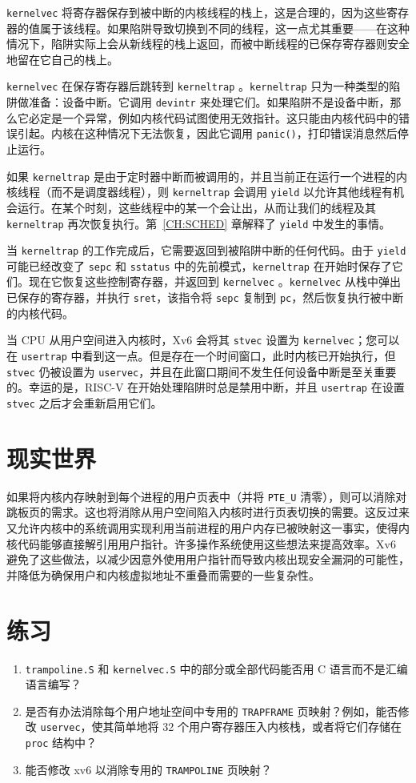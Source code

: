 {\tt kernelvec} 将寄存器保存到被中断的内核线程的栈上，这是合理的，因为这些寄存器的值属于该线程。如果陷阱导致切换到不同的线程，这一点尤其重要——在这种情况下，陷阱实际上会从新线程的栈上返回，而被中断线程的已保存寄存器则安全地留在它自己的栈上。

{\tt kernelvec} 在保存寄存器后跳转到 {\tt kerneltrap} 。{\tt kerneltrap} 只为一种类型的陷阱做准备：设备中断。它调用 {\tt devintr}  来处理它们。如果陷阱不是设备中断，那么它必定是一个异常，例如内核代码试图使用无效指针。这只能由内核代码中的错误引起。内核在这种情况下无法恢复，因此它调用 {\tt panic()}，打印错误消息然后停止运行。

如果 {\tt kerneltrap} 是由于定时器中断而被调用的，并且当前正在运行一个进程的内核线程（而不是调度器线程），则 {\tt kerneltrap} 会调用 {\tt yield} 以允许其他线程有机会运行。在某个时刻，这些线程中的某一个会让出，从而让我们的线程及其 {\tt kerneltrap} 再次恢复执行。第~\ref{CH:SCHED} 章解释了 {\tt yield} 中发生的事情。

当 {\tt kerneltrap} 的工作完成后，它需要返回到被陷阱中断的任何代码。由于 {\tt yield} 可能已经改变了 {\tt sepc} 和 {\tt sstatus} 中的先前模式，{\tt kerneltrap} 在开始时保存了它们。现在它恢复这些控制寄存器，并返回到 {\tt kernelvec} 。{\tt kernelvec} 从栈中弹出已保存的寄存器，并执行 {\tt sret}，该指令将 {\tt sepc} 复制到 {\tt pc}，然后恢复执行被中断的内核代码。

当 CPU 从用户空间进入内核时，Xv6 会将其 {\tt stvec} 设置为 {\tt kernelvec}；您可以在 {\tt usertrap}  中看到这一点。但是存在一个时间窗口，此时内核已开始执行，但 {\tt stvec} 仍被设置为 {\tt uservec}，并且在此窗口期间不发生任何设备中断是至关重要的。幸运的是，RISC-V 在开始处理陷阱时总是禁用中断，并且 {\tt usertrap} 在设置 {\tt stvec} 之后才会重新启用它们。

\section{现实世界}

如果将内核内存映射到每个进程的用户页表中（并将 \lstinline{PTE_U} 清零），则可以消除对跳板页的需求。这也将消除从用户空间陷入内核时进行页表切换的需要。这反过来又允许内核中的系统调用实现利用当前进程的用户内存已被映射这一事实，使得内核代码能够直接解引用用户指针。许多操作系统使用这些想法来提高效率。Xv6 避免了这些做法，以减少因意外使用用户指针而导致内核出现安全漏洞的可能性，并降低为确保用户和内核虚拟地址不重叠而需要的一些复杂性。

\section{练习}

\begin{enumerate}

\item {\tt trampoline.S} 和 {\tt kernelvec.S} 中的部分或全部代码能否用 C 语言而不是汇编语言编写？

\item 是否有办法消除每个用户地址空间中专用的 {\tt TRAPFRAME} 页映射？例如，能否修改 {\tt uservec}，使其简单地将 32 个用户寄存器压入内核栈，或者将它们存储在 {\tt proc} 结构中？

\item 能否修改 xv6 以消除专用的 {\tt TRAMPOLINE} 页映射？

\end{enumerate}
